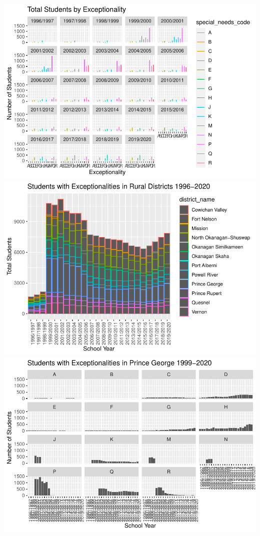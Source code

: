 \documentclass[
  english,
  man]{apa6}
\begin{document}
\includegraphics{draft_play_files/figure-latex/rural play-1.pdf} \includegraphics{draft_play_files/figure-latex/rural play-2.pdf} \includegraphics{draft_play_files/figure-latex/rural play-3.pdf}
\end{document}
